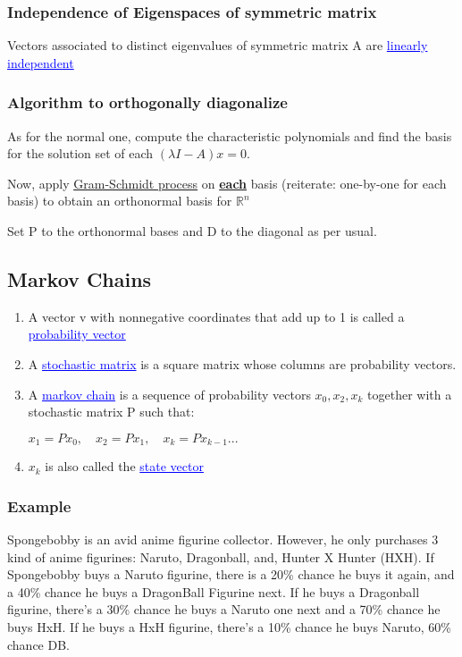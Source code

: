 \documentclass{article}
\newcommand{\bul}[1]{\textcolor{blue}{\underline{#1}}}
\begin{document}
\subsubsection{Independence of Eigenspaces of symmetric matrix}
Vectors associated to distinct eigenvalues of symmetric matrix A are \bul{linearly independent}

\subsubsection{Algorithm to orthogonally diagonalize}
As for the normal one, compute the characteristic polynomials and find the basis for the solution set of each $(\lambda I - A)x=0$.

Now, apply \underline{\hyperref[sec:gsp]{Gram-Schmidt process}} on \underline{\textbf{each}} basis (reiterate: one-by-one for each basis) to obtain an orthonormal basis for $\mathbb{R}^n$

Set P to the orthonormal bases and D to the diagonal as per usual.

\subsection{Markov Chains}
\begin{enumerate}
    \item A vector v with nonnegative coordinates that add up to 1 is called a \bul{probability vector}
    \item A \bul{stochastic matrix} is a square matrix whose columns are probability vectors.
    \item A \bul{markov chain} is a sequence of probability vectors $x_0,x_2,x_k$ together with a stochastic matrix P such that:
\begin{center}
    $x_1 = Px_0, \quad x_2 = Px_1, \quad x_k=Px_{k-1} ...$
\end{center}
    \item $x_k$ is also called the \bul{state vector}
\end{enumerate}

\subsubsection{Example}
Spongebobby is an avid anime figurine collector. However, he only purchases 3 kind of anime figurines: Naruto, Dragonball, and, Hunter X Hunter (HXH). If Spongebobby buys a Naruto figurine, there is a 20\% chance he buys it again, and a 40\% chance he buys a DragonBall Figurine next.
If he buys a Dragonball figurine, there's a 30\% chance he buys a Naruto one next and a 70\% chance he buys HxH. If he buys a HxH figurine, there's a 10\% chance he buys Naruto, 60\% chance DB.
\end{document}
